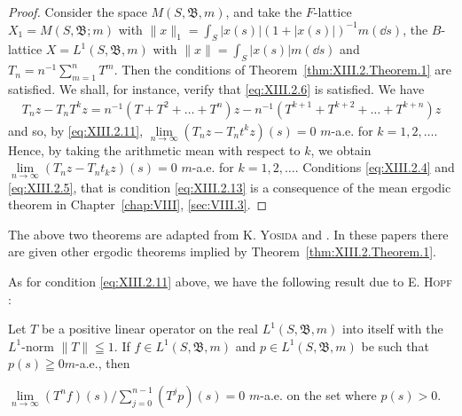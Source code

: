 \begin{proof}
 Consider the space $M(S, \mathfrak{B}, m)$, and take the $F$-lattice $X_1 = M(S, \mathfrak{B}; m)$ with $\|x\|_1 = \int_S |x(s)| (1 + |x(s)|)^{-1} m(\dd s)$, the $B$-lattice $X = L^1(S, \mathfrak{B}, m)$ with $\|x\| = \int_S |x(s)| m(\dd s)$ and $T_n = n^{-1} \sum\limits_{m=1}^{n} T^m$. Then the conditions of Theorem~\ref{thm:XIII.2.Theorem.1} are satisfied. We shall, for instance, verify that \eqref{eq:XIII.2.6} is satisfied. We have 
\[
\begin{gathered}
T _{n} z - T _{n} T ^{k} z = n ^{-1} (T + T ^{2} + \dots + T ^{n}) z - n ^{-1} (T ^{k+1} + T ^{k+2} + \dots + T ^{k+n}) z
\end{gathered}
\]
and so, by \eqref{eq:XIII.2.11}, $\lim\limits_{n\to \infty}(T_nz - T_nt^k z)(s) = 0$ $m$-a.e. for $k = 1,2,\ldots$. Hence, by taking the arithmetic mean with respect to $k$, we obtain $\lim\limits_{n\to \infty}(T_nz - T_nt_kz)(s) = 0$ $m$-a.e. for $k = 1,2,\ldots$. Conditions \eqref{eq:XIII.2.4} and \eqref{eq:XIII.2.5}, that is condition \eqref{eq:XIII.2.13} is a consequence of the mean ergodic theorem in Chapter~\ref{chap:VIII}, \ref{sec:VIII.3}. 
\end{proof}

\begin{remarku} The above two theorems are adapted from K. \textsc{Yosida} \cite{yosida358} and \cite{yosida361}. In these papers there are given other ergodic theorems implied by Theorem~\ref{thm:XIII.2.Theorem.1}. 
\end{remarku}

As for condition \eqref{eq:XIII.2.11} above, we have the following result due to E. \textsc{Hopf} \cite{hirsch111}: 

\begin{theorem}\label{thm:XIII.2.Theorem.3} Let $T$ be a positive linear operator on the real $L^1(S, \mathfrak{B}, m)$ into itself with the $L^1$-norm $\| T \| \leqq 1$. If $f \in L^1(S, \mathfrak{B}, m)$ and $p \in L^1(S, \mathfrak{B}, m)$ be such that $p(s) \geqq 0m$-a.e., then 

$\lim\limits_{n \to \infty} (T^n f)(s) / \sum\limits_{j=0}^{n-1} (T^j p)(s) = 0$ $m$-a.e. on the set where $p(s) > 0$. 
\end{theorem}

